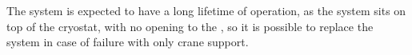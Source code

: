 The system is expected to have a long lifetime of operation, as the  system sits on top of the cryostat, with no opening to the , so it is possible to replace the system in case of failure with only crane support.

